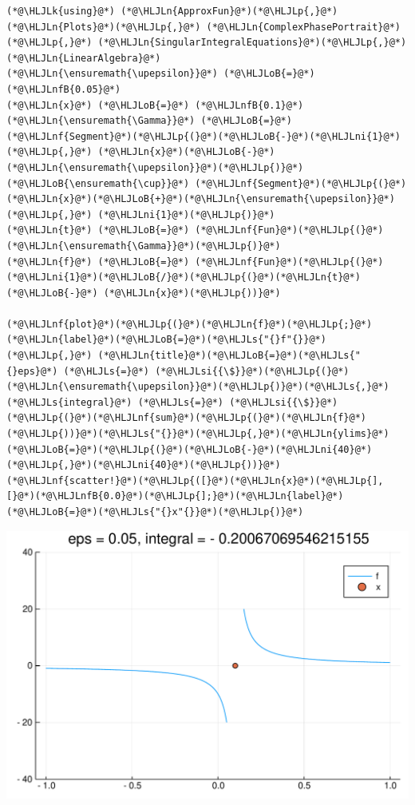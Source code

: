 \documentclass[12pt,a4paper]{article}
\newcommand{\HLJLk}[1]{\textcolor[RGB]{148,91,176}{\textbf{#1}}}
\newcommand{\HLJLn}[1]{#1}
\newcommand{\HLJLnf}[1]{\textcolor[RGB]{66,102,213}{#1}}
\newcommand{\HLJLs}[1]{\textcolor[RGB]{201,61,57}{#1}}
\newcommand{\HLJLsi}[1]{#1}
\newcommand{\HLJLnfB}[1]{\textcolor[RGB]{59,151,46}{#1}}
\newcommand{\HLJLni}[1]{\textcolor[RGB]{59,151,46}{#1}}
\newcommand{\HLJLoB}[1]{\textcolor[RGB]{102,102,102}{\textbf{#1}}}
\newcommand{\HLJLp}[1]{#1}
\def\upepsilon{\varepsilon}
\begin{document}
\begin{lstlisting}
(*@\HLJLk{using}@*) (*@\HLJLn{ApproxFun}@*)(*@\HLJLp{,}@*) (*@\HLJLn{Plots}@*)(*@\HLJLp{,}@*) (*@\HLJLn{ComplexPhasePortrait}@*)(*@\HLJLp{,}@*) (*@\HLJLn{SingularIntegralEquations}@*)(*@\HLJLp{,}@*) (*@\HLJLn{LinearAlgebra}@*)
(*@\HLJLn{\ensuremath{\upepsilon}}@*) (*@\HLJLoB{=}@*) (*@\HLJLnfB{0.05}@*)
(*@\HLJLn{x}@*) (*@\HLJLoB{=}@*) (*@\HLJLnfB{0.1}@*)
(*@\HLJLn{\ensuremath{\Gamma}}@*) (*@\HLJLoB{=}@*) (*@\HLJLnf{Segment}@*)(*@\HLJLp{(}@*)(*@\HLJLoB{-}@*)(*@\HLJLni{1}@*) (*@\HLJLp{,}@*) (*@\HLJLn{x}@*)(*@\HLJLoB{-}@*)(*@\HLJLn{\ensuremath{\upepsilon}}@*)(*@\HLJLp{)}@*) (*@\HLJLoB{\ensuremath{\cup}}@*) (*@\HLJLnf{Segment}@*)(*@\HLJLp{(}@*)(*@\HLJLn{x}@*)(*@\HLJLoB{+}@*)(*@\HLJLn{\ensuremath{\upepsilon}}@*) (*@\HLJLp{,}@*) (*@\HLJLni{1}@*)(*@\HLJLp{)}@*)
(*@\HLJLn{t}@*) (*@\HLJLoB{=}@*) (*@\HLJLnf{Fun}@*)(*@\HLJLp{(}@*)(*@\HLJLn{\ensuremath{\Gamma}}@*)(*@\HLJLp{)}@*)
(*@\HLJLn{f}@*) (*@\HLJLoB{=}@*) (*@\HLJLnf{Fun}@*)(*@\HLJLp{(}@*)(*@\HLJLni{1}@*)(*@\HLJLoB{/}@*)(*@\HLJLp{(}@*)(*@\HLJLn{t}@*) (*@\HLJLoB{-}@*) (*@\HLJLn{x}@*)(*@\HLJLp{))}@*)

(*@\HLJLnf{plot}@*)(*@\HLJLp{(}@*)(*@\HLJLn{f}@*)(*@\HLJLp{;}@*) (*@\HLJLn{label}@*)(*@\HLJLoB{=}@*)(*@\HLJLs{"{}f"{}}@*)(*@\HLJLp{,}@*) (*@\HLJLn{title}@*)(*@\HLJLoB{=}@*)(*@\HLJLs{"{}eps}@*) (*@\HLJLs{=}@*) (*@\HLJLsi{{\$}}@*)(*@\HLJLp{(}@*)(*@\HLJLn{\ensuremath{\upepsilon}}@*)(*@\HLJLp{)}@*)(*@\HLJLs{,}@*) (*@\HLJLs{integral}@*) (*@\HLJLs{=}@*) (*@\HLJLsi{{\$}}@*)(*@\HLJLp{(}@*)(*@\HLJLnf{sum}@*)(*@\HLJLp{(}@*)(*@\HLJLn{f}@*)(*@\HLJLp{))}@*)(*@\HLJLs{"{}}@*)(*@\HLJLp{,}@*)(*@\HLJLn{ylims}@*)(*@\HLJLoB{=}@*)(*@\HLJLp{(}@*)(*@\HLJLoB{-}@*)(*@\HLJLni{40}@*)(*@\HLJLp{,}@*)(*@\HLJLni{40}@*)(*@\HLJLp{))}@*)
(*@\HLJLnf{scatter!}@*)(*@\HLJLp{([}@*)(*@\HLJLn{x}@*)(*@\HLJLp{],[}@*)(*@\HLJLnfB{0.0}@*)(*@\HLJLp{];}@*)(*@\HLJLn{label}@*)(*@\HLJLoB{=}@*)(*@\HLJLs{"{}x"{}}@*)(*@\HLJLp{)}@*)
\end{lstlisting}

\includegraphics[width=\linewidth]{figures/Lecture14_1_1.pdf}
\end{document}
